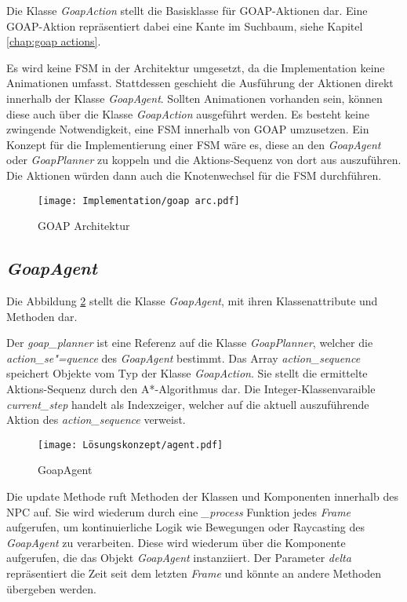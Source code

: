 Die Klasse \textit{GoapAction} stellt die Basisklasse für GOAP-Aktionen dar. Eine GOAP-Aktion repräsentiert dabei eine Kante im Suchbaum, siehe Kapitel \ref{chap:goap actions}.

Es wird keine FSM in der Architektur umgesetzt, da die Implementation keine Animationen umfasst. Stattdessen geschieht die Ausführung der Aktionen direkt innerhalb der Klasse \textit{GoapAgent}. Sollten Animationen vorhanden sein, können diese auch über die Klasse \textit{GoapAction} ausgeführt werden. Es besteht keine zwingende Notwendigkeit, eine FSM innerhalb von GOAP umzusetzen. Ein Konzept für die Implementierung einer FSM wäre es, diese an den \textit{GoapAgent} oder \textit{GoapPlanner} zu koppeln und die Aktions-Sequenz von dort aus auszuführen. Die Aktionen würden dann auch die Knotenwechsel für die FSM durchführen.

\begin{figure}[h]
  \centering
  \texttt{[image: Implementation/goap arc.pdf]}
	\captionsetup{justification=justified, format=plain}
  \caption{GOAP Architektur}
  \label{fig:GOAP Architektur}
\end{figure}




\subsection{\textit{GoapAgent}}
\label{chap:goapagent uml}

Die Abbildung \ref{fig:GoapAgent} stellt die Klasse \textit{GoapAgent}, mit ihren Klassenattribute und Methoden dar.

Der \textit{goap\_planner} ist eine Referenz auf die Klasse \textit{GoapPlanner}, welcher die \textit{action\_se"=quence} des \textit{GoapAgent} bestimmt. Das Array \textit{action\_sequence} speichert Objekte vom Typ der Klasse \textit{GoapAction}. Sie stellt die ermittelte Aktions-Sequenz durch den A*-Algorithmus dar. Die Integer-Klassenvaraible \textit{current\_step} handelt als Indexzeiger, welcher auf die aktuell auszuführende Aktion des \textit{action\_sequence} verweist.

\begin{figure}[h]
  \centering
  \texttt{[image: Lösungskonzept/agent.pdf]}
	\captionsetup{justification=justified, format=plain}
  \caption{GoapAgent}
  \label{fig:GoapAgent}
\end{figure}


Die update Methode ruft Methoden der Klassen und Komponenten innerhalb des NPC auf. Sie wird wiederum durch eine \textit{\_process} Funktion jedes \textit{Frame} aufgerufen, um kontinuierliche Logik wie Bewegungen oder Raycasting des \textit{GoapAgent} zu verarbeiten. Diese wird wiederum über die Komponente aufgerufen, die das Objekt \textit{GoapAgent} instanziiert. Der Parameter \textit{delta} repräsentiert die Zeit seit dem letzten \textit{Frame} und könnte an andere Methoden übergeben werden.

